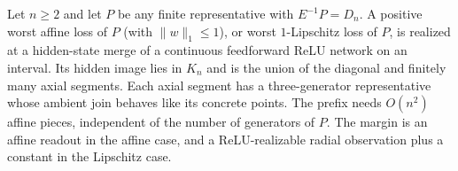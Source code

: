 \begin{theorem}\label{thm:neural-transfer}
Let $n\ge2$ and let $P$ be any finite representative with $E^{-1}P=D_n$. A positive worst affine loss of $P$ (with $\|w\|_1\le1$), or worst $1$-Lipschitz loss of $P$, is realized at a hidden-state merge of a continuous feedforward ReLU network on an interval. Its hidden image lies in $K_n$ and is the union of the diagonal and finitely many axial segments. Each axial segment has a three-generator representative whose ambient join behaves like its concrete points. The prefix needs $O(n^2)$ affine pieces, independent of the number of generators of $P$. The margin is an affine readout in the affine case, and a ReLU-realizable radial observation plus a constant in the Lipschitz case.
\end{theorem}
